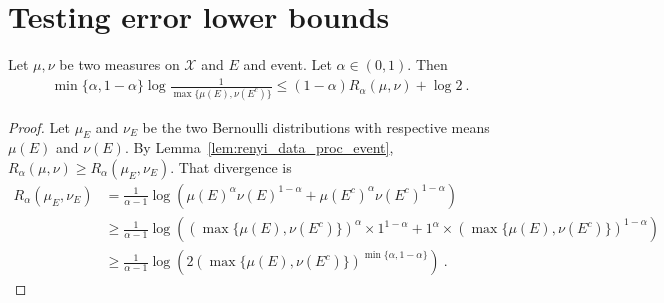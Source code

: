 \chapter{Testing error lower bounds}

\begin{lemma}
  \label{lem:testing_bound_renyi}
  Let $\mu, \nu$ be two measures on $\mathcal X$ and $E$ and event. Let $\alpha \in (0,1)$. Then
  \begin{align*}
  \min\{\alpha, 1 - \alpha\} \log\frac{1}{\max\{\mu(E), \nu(E^c)\}} \le (1 - \alpha) R_{\alpha}(\mu, \nu)  + \log 2 \: .
  \end{align*}
\end{lemma}

\begin{proof}
Let $\mu_E$ and $\nu_E$ be the two Bernoulli distributions with respective means $\mu(E)$ and $\nu(E)$.
By Lemma~\ref{lem:renyi_data_proc_event}, $R_\alpha(\mu, \nu) \ge R_\alpha(\mu_E, \nu_E)$. That divergence is
\begin{align*}
R_\alpha(\mu_E, \nu_E)
&= \frac{1}{\alpha - 1}\log \left(\mu(E)^\alpha \nu(E)^{1 - \alpha}
	+ \mu(E^c)^\alpha \nu(E^c)^{1 - \alpha}\right)
\\
&\ge \frac{1}{\alpha - 1}\log \left((\max\{\mu(E), \nu(E^c)\})^\alpha \times 1^{1 - \alpha}
	+ 1^\alpha \times (\max\{\mu(E), \nu(E^c)\})^{1 - \alpha}\right)
\\
&\ge \frac{1}{\alpha - 1}\log \left(2 (\max\{\mu(E), \nu(E^c)\})^{\min\{\alpha, 1-\alpha\}}\right) \: .
\end{align*}
\end{proof}
